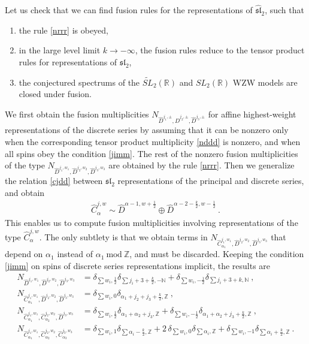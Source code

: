 \documentclass[12pt, a4paper, notitlepage, twoside]{report}
\numberwithin{equation}{section}
\theoremstyle{break}
\begin{document}
Let us check that we can find fusion rules for the representations of $\widehat{\mathfrak{sl}}_2$, such that
\begin{enumerate}
 \item the rule \eqref{nrrr} is obeyed,
\item in the large level limit $k\to -\infty$, the fusion rules reduce to the tensor product rules for representations of $\mathfrak{sl}_2$,
\item the conjectured spectrums of the $\widetilde{SL}_2(\mathbb{R})$ and $SL_2(\mathbb{R})$ WZW models are closed under fusion.
\end{enumerate}
We first obtain the fusion multiplicities $N_{\hat{D}^{j_1,\pm},\hat{D}^{j_2,\pm},\hat{D}^{j_3,\pm}}$ for affine highest-weight representations of the discrete series  by assuming that it can be nonzero only when the corresponding tensor product multiplicity \eqref{nddd} is nonzero, and when all spins obey the condition \eqref{jimm}.
The rest of the nonzero fusion multiplicities of the type    
$N_{\hat{D}^{j_1,w_1},\hat{D}^{j_2,w_2},\hat{D}^{j_3,w_3}}$ are obtained by the rule \eqref{nrrr}.
Then we generalize the relation \eqref{cjdd} between $\mathfrak{sl}_2$ representations of the principal and discrete series, and obtain 
\begin{align}
 \hat{C}^{j,w}_\alpha \sim \hat{D}^{\alpha-1,w+\frac12} \oplus \hat{D}^{\alpha-2-\frac{k}{2},w-\frac12} \ .
\end{align}
This enables us to compute fusion multiplicities involving representations of the type $\hat{C}^{j,w}_\alpha$.
The only subtlety is that we obtain terms in $N_{\hat{C}^{j_1,w_1}_{\alpha_1},\hat{D}^{j_2,w_2},\hat{D}^{j_3,w_3}}$ that depend on $\alpha_1$ instead of $\alpha_1\ \text{mod}\ {\mathbb{Z}}$, and must be discarded.
Keeping the condition \eqref{jimm} on spins of discrete series representations implicit, the results are 
\begin{align}
 N_{\hat{D}^{j_1,w_1},\hat{D}^{j_2,w_2},\hat{D}^{j_3,w_3}} 
&= \delta_{\sum w_i,\frac12} \delta_{\sum j_i+3+\frac{k}{2},-{\mathbb{N}}} + \delta_{\sum w_i,-\frac12}\delta_{\sum j_i+3+k,{\mathbb{N}}} \ ,
\\
 N_{\hat{C}^{j_1,w_1}_{\alpha_1},\hat{D}^{j_2,w_2},\hat{D}^{j_3,w_3}} &= \delta_{\sum w_i,0} \delta_{\alpha_1+j_2+j_3+\frac{k}{2},{\mathbb{Z}}}\ ,
\\
 N_{\hat{C}^{j_1,w_1}_{\alpha_1},\hat{C}^{j_2,w_2}_{\alpha_2},\hat{D}^{j_3,w_3}} & = \delta_{\sum w_i,\frac12} \delta_{\alpha_1+\alpha_2+j_3,{\mathbb{Z}}} + \delta_{\sum w_i,-\frac12}\delta_{\alpha_1+\alpha_2+j_3+\frac{k}{2},{\mathbb{Z}}}\ ,
\\
N_{\hat{C}^{j_1,w_1}_{\alpha_1},\hat{C}^{j_2,w_2}_{\alpha_2},\hat{C}^{j_3,w_3}_{\alpha_3}} & = \delta_{\sum w_i,1}\delta_{\sum\alpha_i-\frac{k}{2},{\mathbb{Z}}} + 2\, \delta_{\sum w_i,0}\delta_{\sum \alpha_i,{\mathbb{Z}}} + \delta_{\sum w_i,-1}\delta_{\sum\alpha_i+\frac{k}{2},{\mathbb{Z}}}\ .
\end{align}
\end{document}
